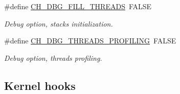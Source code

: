 \begin{DoxyCompactItemize}
\#define \hyperlink{group__config_ga6a859dd249adfb66b9bbf809061ea06c}{C\+H\+\_\+\+D\+B\+G\+\_\+\+F\+I\+L\+L\+\_\+\+T\+H\+R\+E\+A\+DS}~F\+A\+L\+SE
\begin{DoxyCompactList}\small\item\em Debug option, stacks initialization. \end{DoxyCompactList}\item 
\#define \hyperlink{group__config_gadc9c00c2e5b6e766ded8dfa77c0c90c1}{C\+H\+\_\+\+D\+B\+G\+\_\+\+T\+H\+R\+E\+A\+D\+S\+\_\+\+P\+R\+O\+F\+I\+L\+I\+NG}~F\+A\+L\+SE
\begin{DoxyCompactList}\small\item\em Debug option, threads profiling. \end{DoxyCompactList}\end{DoxyCompactItemize}
\subsection*{Kernel hooks}
